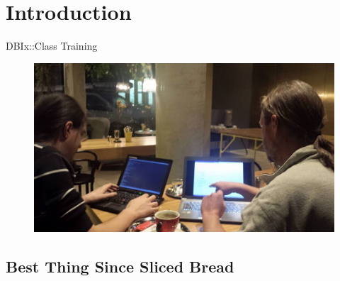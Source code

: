 
\maketitle

\begin{frame}
  \titlepage
\end{frame}

\cleardoublepage

\tableofcontents

\cleardoublepage

\section{Introduction}

\begin{frame}{DBIx::Class Training}
\begin{figure}[!ht]
\centering
\includegraphics[width=1\linewidth]{img/training-preps.jpg}
\end{figure}
\end{frame}

\subsection{Best Thing Since Sliced Bread}

